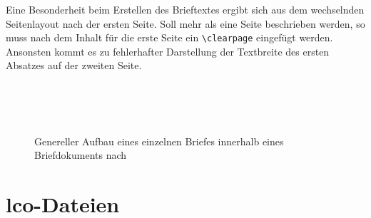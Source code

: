 \begin{important}
Eine Besonderheit beim Erstellen des Brieftextes ergibt sich aus dem wechselnden
Seitenlayout nach der ersten Seite.
Soll mehr als eine Seite beschrieben werden, so muss nach
dem Inhalt für die erste Seite ein \lstinline{\clearpage} eingefügt werden.
Ansonsten kommt es zu fehlerhafter Darstellung der Textbreite des ersten
Absatzes auf der zweiten Seite.
\end{important}


\begin{figure}[!ht]
  \centering\small
  \\[1pt]
  \\[1pt]
  \\[\dp\strutbox]
  \caption[Genereller Aufbau eines einzelnen Briefes innerhalb eines
    Briefdokuments]{Genereller Aufbau eines einzelnen Briefes
    innerhalb eines Briefdokuments nach \cite[S.171]{koma-skript} }
  \label{fig:scrlttr2.letter}
\end{figure}

\section{lco-Dateien}\label{sec:lco}

